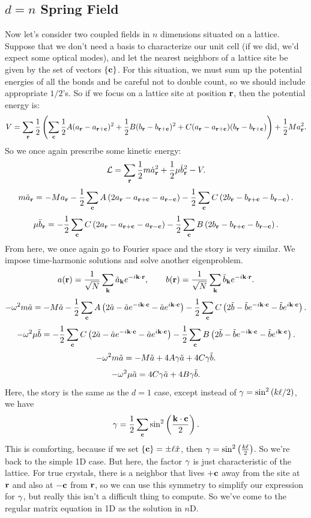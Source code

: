 \documentclass[12pt]{article}
\begin{document}
\subsection{$d=n$ Spring Field}
Now let's consider two coupled fields in $n$ dimensions situated on a lattice. Suppose that we don't need a basis to characterize our unit cell (if we did, we'd expect some optical modes), and let the nearest neighbors of a lattice site be given by the set of vectors $\{\mathbf{c}\}$. For this situation, we must sum up the potential energies of all the bonds and be careful not to double count, so we should include appropriate $1/2$'s. So if we focus on a lattice site at position $\mathbf{r}$, then the potential energy is:
\[ V = \sum_{\mathbf{r}} \frac{1}{2}\left(\sum_{\mathbf{c}}\frac{1}{2}A(a_{\mathbf{r}} - a_{\mathbf{r} + \mathbf{c}})^2 + \frac{1}{2}B(b_{\mathbf{r}} - b_{\mathbf{r} + \mathbf{c}})^2 + C(a_{\mathbf{r}} - a_{\mathbf{r}+\mathbf{c}})(b_{\mathbf{r}} - b_{\mathbf{r}+\mathbf{c}})\right) + \frac{1}{2}Ma_{\mathbf{r}}^2.\]
So we once again prescribe some kinetic energy:
\[ \mathcal{L} = \sum_{\mathbf{r}} \frac{1}{2}m \dot{a}_{\mathbf{r}}^2 + \frac{1}{2}\mu \dot{b}_{\mathbf{r}}^2 - V.\]
\[ m\ddot{a}_{\mathbf{r}} = -Ma_{\mathbf{r}} -\frac{1}{2} \sum_{\mathbf{c}} A\left(2 a_{\mathbf{r}} - a_{\mathbf{r} + \mathbf{c}} - a_{\mathbf{r} - \mathbf{c}}\right)-\frac{1}{2}\sum_{\mathbf{c}} C\left(2 b_{\mathbf{r}} - b_{\mathbf{r} + \mathbf{c}} - b_{\mathbf{r} - \mathbf{c}}\right).\]
\[ \mu\ddot{b}_{\mathbf{r}} = -\frac{1}{2} \sum_{\mathbf{c}} C\left(2 a_{\mathbf{r}} - a_{\mathbf{r} + \mathbf{c}} - a_{\mathbf{r} - \mathbf{c}}\right)-\frac{1}{2}\sum_{\mathbf{c}} B\left(2 b_{\mathbf{r}} - b_{\mathbf{r} + \mathbf{c}} - b_{\mathbf{r} - \mathbf{c}}\right).\]
From here, we once again go to Fourier space and the story is very similar. We impose time-harmonic solutions and solve another eigenproblem.
\[ a(\mathbf{r}) = \frac{1}{\sqrt{N}} \sum_{\mathbf{k}} \tilde{a}_{\mathbf{k}} e^{-i \mathbf{k}\cdot\mathbf{r}},\qquad b(\mathbf{r}) = \frac{1}{\sqrt N}\sum_{\mathbf{k}} \tilde{b}_{\mathbf{k}}e^{-i \mathbf{k}\cdot\mathbf{r}}.\]
\[ -\omega^2 m \tilde a = -M \tilde a - \frac{1}{2}\sum_{\mathbf{c}}A \left(2 \tilde a - \tilde a e^{-i\mathbf{k}\cdot\mathbf{c}} - \tilde a e^{i\mathbf{k}\cdot\mathbf{c}}\right) - \frac{1}{2}\sum_{\mathbf{c}}C \left(2 \tilde b - \tilde b e^{-i\mathbf{k}\cdot\mathbf{c}} - \tilde b e^{i\mathbf{k}\cdot\mathbf{c}}\right).\]
\[ -\omega^2 \mu \tilde b =  - \frac{1}{2}\sum_{\mathbf{c}} C\left(2 \tilde a - \tilde a e^{-i\mathbf{k}\cdot\mathbf{c}} - \tilde a e^{i\mathbf{k}\cdot\mathbf{c}}\right) - \frac{1}{2}\sum_{\mathbf{c}} B\left(2 \tilde b - \tilde b e^{-i\mathbf{k}\cdot\mathbf{c}} - \tilde b e^{i\mathbf{k}\cdot\mathbf{c}}\right).\]
\[ -\omega^2 m \tilde a = -M \tilde a + 4A\gamma \tilde a + 4C\gamma \tilde b.\]
\[ -\omega^2 \mu \tilde a = 4C \gamma \tilde a + 4B \gamma \tilde b.\]
Here, the story is the same as the $d=1$ case, except instead of $\gamma = 
\sin^2\left(k\ell/2\right)$, we have
\[ \gamma = \frac{1}{2} \sum_{\mathbf{c}}\sin^2 \left(\frac{\mathbf{k}\cdot\mathbf{c}}{2}\right).\]
This is comforting, because if we set $\{\mathbf{c}\} = \pm \ell \hat{x}$, then $\gamma = \sin^2\left(\frac{k\ell}{2}\right)$. So we're back to the simple 1D case. But here, the factor $\gamma$ is just characteristic of the lattice. For true crystals, there is a neighbor that lives $+\mathbf{c}$ away from the site at $\mathbf{r}$ and also at $-\mathbf{c}$ from $\mathbf{r}$, so we can use this symmetry to simplify our expression for $\gamma$, but really this isn't a difficult thing to compute. So we've come to the regular matrix equation in 1D as the solution in $n$D.
\end{document}
